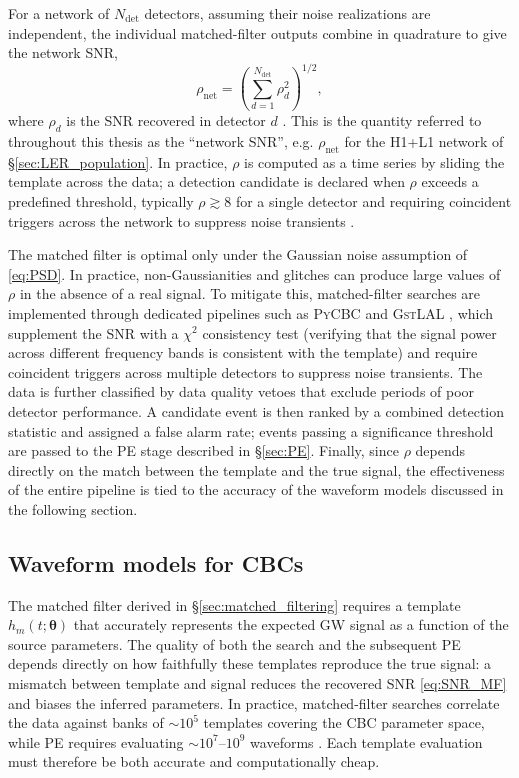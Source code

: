 For a network of $N_\mathrm{det}$ detectors, assuming their noise realizations are independent, the individual matched-filter outputs combine in quadrature to give the network SNR,
\begin{equation}
    \rho_\mathrm{net} = \left( \sum_{d=1}^{N_\mathrm{det}} \rho_d^2 \right)^{1/2},
    \label{eq:network_SNR}
\end{equation}
where $\rho_d$ is the SNR recovered in detector $d$ \cite{GWTC5_methods}. This is the quantity referred to throughout this thesis as the ``network SNR'', e.g. $\rho_\mathrm{net}$ for the H1+L1 network of \S\ref{sec:LER_population}. In practice, $\rho$ is computed as a time series by sliding the template across the data; a detection candidate is declared when $\rho$ exceeds a predefined threshold, typically $\rho \gtrsim 8$ for a single detector and requiring coincident triggers across the network to suppress noise transients \cite{GWTC5_methods}.

The matched filter is optimal only under the Gaussian noise 
assumption of \eqref{eq:PSD}. In practice, non-Gaussianities and glitches can produce large values of $\rho$ in the absence of a real signal. To mitigate this, matched-filter searches are implemented through dedicated pipelines such as \textsc{PyCBC} \cite{PYCBC} and \textsc{GstLAL} \cite{GSTLAL}, which supplement the SNR with a $\chi^2$ consistency test (verifying that the signal power across different frequency bands is consistent with the template) and require coincident triggers across multiple detectors to suppress noise transients. The data is further classified by data quality vetoes that exclude periods of poor detector performance. A candidate event is then ranked by a combined detection statistic and assigned a false alarm rate; events passing a significance threshold are passed to the PE stage described in \S\ref{sec:PE}. Finally, since $\rho$ depends directly on the match between the template and the true signal, the effectiveness of the entire pipeline is tied to the accuracy of the waveform models discussed in the following section.

\subsection{Waveform models for CBCs}
\label{sec:waveform_models}


The matched filter derived in \S\ref{sec:matched_filtering} requires a template $h_m(t;\boldsymbol{\theta})$ that accurately represents the expected GW signal as a function of the source parameters. The quality of both the search and the subsequent PE depends directly on how faithfully these templates reproduce the true signal: a mismatch between template and signal reduces the recovered SNR \eqref{eq:SNR_MF} and biases the inferred parameters. In practice, matched-filter searches correlate the data against banks of $\sim\!10^5$ templates covering the CBC parameter space, while PE requires evaluating $\sim\!10^7$--$10^9$ waveforms \cite{template_bank}. Each template evaluation must therefore be both accurate and computationally cheap.


